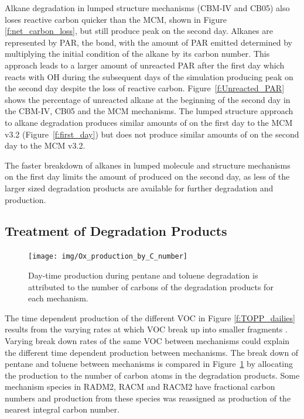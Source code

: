 Alkane degradation in lumped structure mechanisms (CBM-IV and CB05) also loses reactive carbon quicker than the MCM, shown in Figure \ref{f:net_carbon_loss}, but still produce peak  on the second day.
Alkanes are represented by PAR, the  bond, with the amount of PAR emitted determined by multiplying the initial condition of the alkane by its carbon number.
This approach leads to a larger amount of unreacted PAR after the first day which reacts with OH during the subsequent days of the simulation producing peak  on the second day despite the loss of reactive carbon.
\mbox{Figure \ref{f:Unreacted_PAR}} shows the percentage of unreacted alkane at the beginning of the second day in the CBM-IV, CB05 and the MCM mechanisms.
The lumped structure approach to alkane degradation produces similar amounts of  on the first day to the MCM v3.2 (\mbox{Figure \ref{f:first_day}}) but does not produce similar amounts of  on the second day to the MCM v3.2.

The faster breakdown of alkanes in lumped molecule and structure mechanisms on the first day limits the amount of  produced on the second day, as less of the larger sized degradation products are available for further degradation and  production.  
%
\subsection{Treatment of Degradation Products} \label{ss:products} 
%
\begin{figure}
    \centering
    \texttt{[image: img/Ox\_production\_by\_C\_number]}
    \vspace{0mm}
    \caption{Day-time  production during pentane and toluene degradation is attributed to the number of carbons of the degradation products for each mechanism.}
    \vspace{-4mm}
    \label{f:carbon}
\end{figure}
%
The time dependent  production of the different VOC in Figure \ref{f:TOPP_dailies} results from the varying rates at which VOC break up into smaller fragments \citep{Butler:2011}.
Varying break down rates of the same VOC between mechanisms could explain the different time dependent  production between mechanisms.
The break down of pentane and toluene between mechanisms is compared in \mbox{Figure \ref{f:carbon}} by allocating the  production to the number of carbon atoms in the degradation products.
Some mechanism species in RADM2, RACM and RACM2 have fractional carbon numbers \citep{Stockwell:1990, Stockwell:1997, Goliff:2013} and  production from these species was reassigned as  production of the nearest integral carbon number.  

